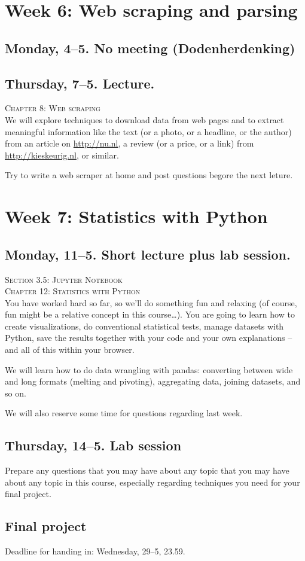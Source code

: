 \section*{Week 6: Web scraping and parsing}

\subsection*{Monday, 4--5. No meeting (Dodenherdenking)}


\subsection*{Thursday, 7--5. Lecture.}
\textsc{ Chapter 8: Web scraping}\\
We will explore techniques to download data from web pages and to extract meaningful information like the text (or a photo, or a headline, or the author) from an article on \url{http://nu.nl}, a review (or a price, or a link) from \url{http://kieskeurig.nl}, or similar. 

Try to write a web scraper at home and post questions begore the next leture.




\section*{Week 7: Statistics with Python}

\subsection*{Monday, 11--5. Short lecture plus lab session.}
\textsc{ Section 3.5: Jupyter Notebook}\\
\textsc{ Chapter 12: Statistics with Python}\\
You have worked hard so far, so we'll do something fun and relaxing (of course, fun might be a relative concept in this course\ldots). You are going to learn how to create visualizations, do conventional statistical tests, manage datasets with Python, save the results together with your code and your own explanations -- and all of this within your browser.

We will learn how to do data wrangling with pandas: converting between wide and long formats (melting and pivoting), aggregating data, joining datasets, and so on.

We will also reserve some time for questions regarding last week.


\subsection*{Thursday, 14--5. Lab session}
Prepare any questions that you may have about any topic that you may have about any topic in this course, especially regarding techniques you need for your final project.



\subsection*{Final project}
Deadline for handing in: Wednesday, 29--5, 23.59.

